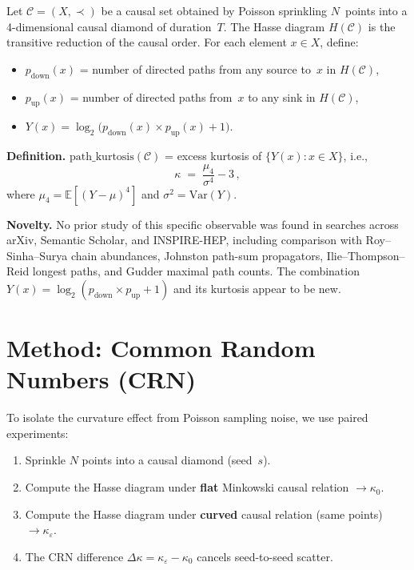 \documentclass[11pt,a4paper]{article}
\begin{document}
Let $\mathcal{C} = (X, \prec)$ be a causal set obtained by Poisson sprinkling $N$~points
into a 4-dimensional causal diamond of duration~$T$.  The Hasse diagram $H(\mathcal{C})$
is the transitive reduction of the causal order.  For each element $x \in X$, define:
\begin{itemize}
  \item $p_{\mathrm{down}}(x)$ = number of directed paths from any source to~$x$ in $H(\mathcal{C})$,
  \item $p_{\mathrm{up}}(x)$ = number of directed paths from~$x$ to any sink in $H(\mathcal{C})$,
  \item $Y(x) = \log_{2}\!\bigl(p_{\mathrm{down}}(x)\times p_{\mathrm{up}}(x) + 1\bigr)$.
\end{itemize}

\medskip\noindent
\textbf{Definition.}\;
$\mathrm{path\_kurtosis}(\mathcal{C})$ = excess kurtosis of $\{Y(x) : x \in X\}$, i.e.,
\begin{equation}
  \kappa \;=\; \frac{\mu_{4}}{\sigma^{4}} - 3\,,
  \label{eq:kurtosis}
\end{equation}
where $\mu_{4} = \mathbb{E}[(Y - \mu)^{4}]$ and $\sigma^{2} = \mathrm{Var}(Y)$.

\medskip\noindent
\textbf{Novelty.}\;
No prior study of this specific observable was found in searches across arXiv, Semantic
Scholar, and INSPIRE-HEP, including comparison with Roy--Sinha--Surya chain abundances,
Johnston path-sum propagators, Ilie--Thompson--Reid longest paths, and Gudder maximal
path counts.  The combination $Y(x) = \log_{2}(p_{\mathrm{down}} \times p_{\mathrm{up}} + 1)$
and its kurtosis appear to be new.

\section{Method: Common Random Numbers (CRN)}
\label{sec:crn}

To isolate the curvature effect from Poisson sampling noise, we use paired experiments:
\begin{enumerate}
  \item Sprinkle $N$ points into a causal diamond (seed~$s$).
  \item Compute the Hasse diagram under \textbf{flat} Minkowski causal relation $\to \kappa_{0}$.
  \item Compute the Hasse diagram under \textbf{curved} causal relation (same points) $\to \kappa_{\varepsilon}$.
  \item The CRN difference $\Delta\kappa = \kappa_{\varepsilon} - \kappa_{0}$ cancels seed-to-seed scatter.
\end{enumerate}
\end{document}
